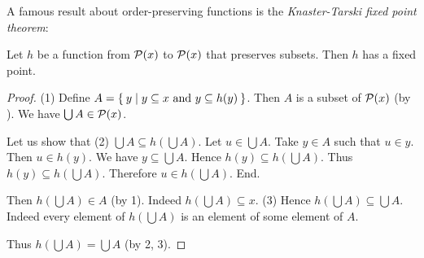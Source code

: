 \documentclass[../../set-theory.tex]{subfiles}
\begin{document}
  \noindent A famous result about order-preserving functions is the
  \textit{Knaster-Tarski fixed point theorem}:

  \begin{forthel}
    \begin{theorem}\label{SetTheory_02_05_636019}
      Let $h$ be a function from $\mathcal{P}(x)$ to $\mathcal{P}(x)$ that preserves subsets.
      Then $h$ has a fixed point.
    \end{theorem}
    \begin{proof}
      (1) Define $A = \Set{y | \text{$y \subseteq x$ and $y \subseteq h(y)$}}$.
      Then $A$ is a subset of $\mathcal{P}(x)$ (by ).
      We have $\bigcup A \in \mathcal{P}(x)$.

      Let us show that (2) $\bigcup A \subseteq h(\bigcup A)$.
        Let $u \in \bigcup A$.
        Take $y \in A$ such that $u \in y$.
        Then $u \in h(y)$.
        We have $y \subseteq \bigcup A$.
        Hence $h(y) \subseteq h(\bigcup A)$.
        Thus $h(y) \subseteq h(\bigcup A)$.
        Therefore $u \in h(\bigcup A)$.
      End.

      Then $h(\bigcup A) \in A$ (by 1).
      Indeed $h(\bigcup A) \subseteq x$.
      (3) Hence $h(\bigcup A) \subseteq \bigcup A$.
      Indeed every element of $h(\bigcup A)$ is an element of some element of $A$.

      Thus $h(\bigcup A) = \bigcup A$ (by 2, 3).
    \end{proof}
  \end{forthel}
\end{document}
